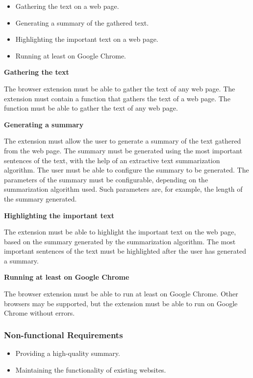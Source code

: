 \documentclass[conference,compsoc]{IEEEtran}
\begin{document}
\begin{itemize}
  \item Gathering the text on a web page.
  \item Generating a summary of the gathered text.
  \item Highlighting the important text on a web page.
  \item Running at least on Google Chrome.
\end{itemize}

\vspace{0.4cm}
\textbf{Gathering the text}

The browser extension must be able to gather the text of any web page.
The extension must contain a function that gathers the text of a web page.
The function must be able to gather the text of any web page.


\vspace{0.4cm}
\textbf{Generating a summary}

The extension must allow the user to generate a summary of the text gathered from the web page.
The summary must be generated using the most important sentences of the text, with the help of an extractive text summarization algorithm.
The user must be able to configure the summary to be generated.
The parameters of the summary must be configurable, depending on the summarization algorithm used.
Such parameters are, for example, the length of the summary generated.

\vspace{0.4cm}
\textbf{Highlighting the important text}

The extension must be able to highlight the important text on the web page, based on the summary generated by the summarization algorithm.
The most important sentences of the text must be highlighted after the user has generated a summary.

\vspace{0.4cm}
\textbf{Running at least on Google Chrome}

The browser extension must be able to run at least on Google Chrome.
Other browsers may be supported, but the extension must be able to run on Google Chrome without errors.


\subsubsection{Non-functional Requirements}
\begin{itemize}
  \item Providing a high-quality summary.
  \item Maintaining the functionality of existing websites.
\end{itemize}
\end{document}
